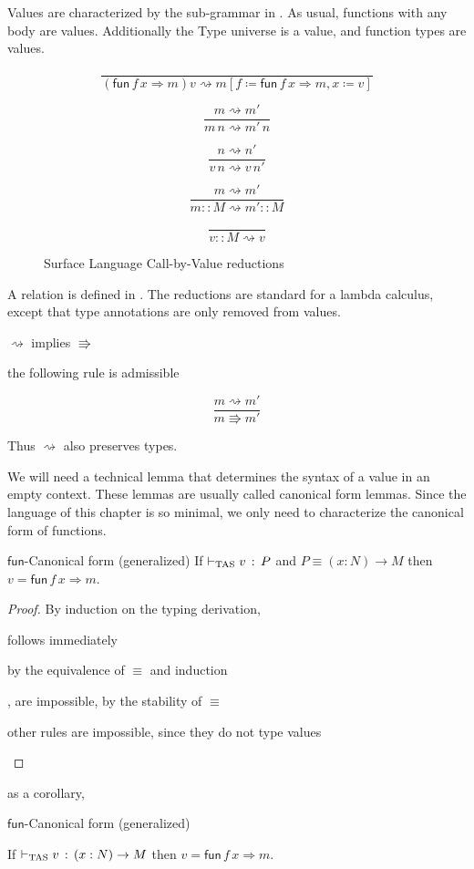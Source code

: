 Values are characterized by the sub-grammar in .
As usual, functions with any body are values.
Additionally the Type universe is a value, and function types are values.
 
\begin{figure}
\[
\frac{\,}{\left(\mathsf{fun}\,f\,x\Rightarrow m\right)v\rightsquigarrow m\left[f\coloneqq\mathsf{fun}\,f\,x\Rightarrow m,x\coloneqq v\right]}
\]
 
\[
\frac{m\rightsquigarrow m'}{m\,n\rightsquigarrow m'\,n}
\]
 
\[
\frac{n\rightsquigarrow n'}{v\,n\rightsquigarrow v\,n'}
\]
 
\[
\frac{m\rightsquigarrow m'}{m::M\rightsquigarrow m'::M}
\]
 
\[
\frac{\,}{v::M\rightsquigarrow v}
\]
 
\caption{Surface Language Call-by-Value reductions}
\label{fig:surface-reduction-step}
\end{figure}
 
A \cbv{} relation is defined in .
The reductions are standard for a \cbv{} lambda calculus, except that type annotations are only removed from values.
 
\begin{fact}
$\rightsquigarrow$ implies $\Rrightarrow$
 
the following rule is admissible
 
\[
\frac{m\rightsquigarrow m'}{m\Rrightarrow m'}
\]
\end{fact}
 
Thus $\rightsquigarrow$ also preserves types.
 
We will need a technical lemma that determines the syntax of a value in an empty context.
These lemmas are usually called canonical form lemmas.
Since the language of this chapter is so minimal, we only need to characterize the canonical form of functions.
 
\begin{lem}
 $\mathsf{fun}$-Canonical form (generalized)
 If $\vdash_{\mathrm{TAS}} v\,:\,P$ and $P\equiv\left(x:N\right)\rightarrow M$ then $v=\mathsf{fun}\,f\,x\Rightarrow m$.
\end{lem}
\begin{proof}
By induction on the typing derivation,
 
\begin{casenv}
\item {} follows immediately
\item {} by the equivalence of $\equiv$ and induction
\item {},  are impossible, by the stability of $\equiv$
\item other rules  are impossible, since they do not type values
\end{casenv}
\end{proof}
as a corollary,
\begin{cor}
$\mathsf{fun}$-Canonical form (generalized)
 
If $\vdash_{\mathrm{TAS}} v\,:\,\left(x:N\right)\rightarrow M$ then \textup{$v=\mathsf{fun}\,f\,x\Rightarrow m$.}
\end{cor}
 
